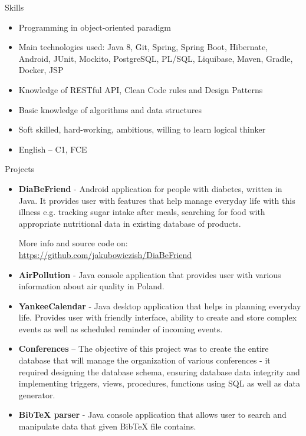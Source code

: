 \documentclass{resume} %
\begin{document}

\begin{rSection}{Skills}
\begin{itemize}
 \setlength\itemsep{-0.5em}
\item Programming in object-oriented paradigm
\item Main technologies used: Java 8, Git, Spring, Spring Boot, Hibernate, Android, JUnit, Mockito, PostgreSQL, PL/SQL, Liquibase, Maven, Gradle, Docker, JSP
\item Knowledge of RESTful API, Clean Code rules and Design Patterns
\item Basic knowledge of algorithms and data structures
\item Soft skilled, hard-working, ambitious, willing to learn logical thinker
\item English – C1, FCE
\end{itemize}
\end{rSection}



\begin{rSection}{Projects}
\begin{itemize} 
 \setlength\itemsep{0em}
\item \textbf{DiaBeFriend} - Android application for people with diabetes, written in Java. 
It provides user with features that
help manage everyday life with this illness e.g. tracking sugar intake after meals, searching for food with appropriate nutritional data in existing database of products.

 More info and source code on: \url{https://github.com/jakubowiczish/DiaBeFriend}

\item \textbf{AirPollution} - Java console application that provides user with various information about air quality in Poland.

\item \textbf{YankeeCalendar} - Java desktop application that helps in planning everyday life. Provides user with friendly interface, ability to create and store complex events as well as scheduled reminder of incoming events.

\item \textbf{Conferences} – The objective of this project was to create the entire database that will manage the organization
of various conferences - it required designing the database schema, ensuring database data integrity and
implementing triggers, views, procedures, functions using SQL as well as data generator.

\item \textbf{BibTeX parser} - Java console application that allows user to search and manipulate data that given BibTeX file
contains.
\end{itemize}
\end{rSection}
\end{document}
